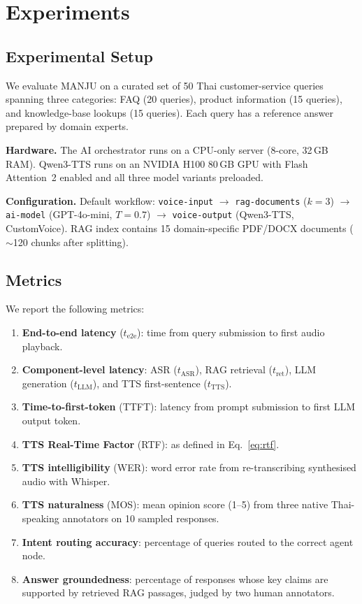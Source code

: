 \documentclass[10pt, a4paper, twocolumn]{article}
\begin{document}
\section{Experiments}
\label{sec:experiments}

\subsection{Experimental Setup}

We evaluate MANJU on a curated set of 50 Thai customer-service queries spanning three categories: FAQ (20 queries), product information (15 queries), and knowledge-base lookups (15 queries).
Each query has a reference answer prepared by domain experts.

\noindent\textbf{Hardware.}
The AI orchestrator runs on a CPU-only server (8-core, 32\,GB RAM).
Qwen3-TTS runs on an NVIDIA H100 80\,GB GPU with Flash Attention~2 enabled and all three model variants preloaded.

\noindent\textbf{Configuration.}
Default workflow: \texttt{voice-input} $\rightarrow$ \texttt{rag-documents} ($k{=}3$) $\rightarrow$ \texttt{ai-model} (GPT-4o-mini, $T{=}0.7$) $\rightarrow$ \texttt{voice-output} (Qwen3-TTS, CustomVoice).
RAG index contains 15 domain-specific PDF/DOCX documents (${\sim}$120 chunks after splitting).

\subsection{Metrics}

We report the following metrics:
\begin{enumerate}[label=(\roman*), nosep]
    \item \textbf{End-to-end latency} ($t_\text{e2e}$): time from query submission to first audio playback.
    \item \textbf{Component-level latency}: ASR ($t_\text{ASR}$), RAG retrieval ($t_\text{ret}$), LLM generation ($t_\text{LLM}$), and TTS first-sentence ($t_\text{TTS}$).
    \item \textbf{Time-to-first-token} (TTFT): latency from prompt submission to first LLM output token.
    \item \textbf{TTS Real-Time Factor} (RTF): as defined in Eq.~\eqref{eq:rtf}.
    \item \textbf{TTS intelligibility} (WER): word error rate from re-transcribing synthesised audio with Whisper.
    \item \textbf{TTS naturalness} (MOS): mean opinion score (1--5) from three native Thai-speaking annotators on 10 sampled responses.
    \item \textbf{Intent routing accuracy}: percentage of queries routed to the correct agent node.
    \item \textbf{Answer groundedness}: percentage of responses whose key claims are supported by retrieved RAG passages, judged by two human annotators.
\end{enumerate}
\end{document}
